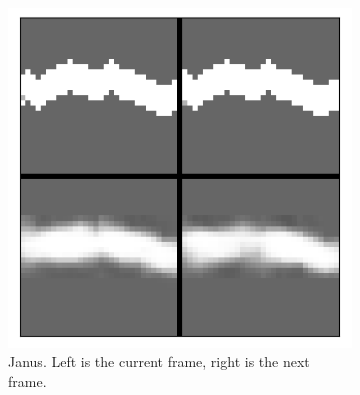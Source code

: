 \begin{figure}[t!]
	\centering
	\begin{subfigure}{0.6\columnwidth}
		\centering
		\includegraphics[width=\linewidth]{img/janus_tunnel_recon.png}
		\caption{Janus. Left is the current frame, right is the next frame.}
		\label{subfig:janus_reconstruction}
	\end{subfigure}%
	~ 
	\begin{subfigure}{0.3\columnwidth}
		\centering

\end{subfigure}
\end{figure}
